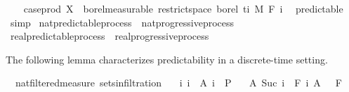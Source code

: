 \begin{isabellebody}
\ \ \isamarkupfalse%
\ {\isachardoublequoteopen}case{\isacharunderscore}{\kern0pt}prod\ X\ {\isasymin}\ borel{\isacharunderscore}{\kern0pt}measurable\ {\isacharparenleft}{\kern0pt}restrict{\isacharunderscore}{\kern0pt}space\ borel\ {\isacharbraceleft}{\kern0pt}ti{\isacharbraceright}{\kern0pt}\ {\isasymOtimes}\isactrlsub M\ F\ i{\isacharparenright}{\kern0pt}{\isachardoublequoteclose}\ \isamarkupfalse%
\ predictable\ \isamarkupfalse%
\ simp\isanewline
{}\isamarkupfalse%
%
\endisatagproof
{\isafoldproof}%
%
\isadelimproof
\isanewline
%
\endisadelimproof
\isanewline
{}\isamarkupfalse%
\ nat{\isacharunderscore}{\kern0pt}predictable{\isacharunderscore}{\kern0pt}process\ {\isasymsubseteq}\ nat{\isacharunderscore}{\kern0pt}progressive{\isacharunderscore}{\kern0pt}process%
\isadelimproof
\ %
\endisadelimproof
%
\isatagproof
\isacommand{{\isachardot}{\kern0pt}{\isachardot}{\kern0pt}}\isamarkupfalse%
%
\endisatagproof
{\isafoldproof}%
%
\isadelimproof
%
\endisadelimproof
\isanewline
{}\isamarkupfalse%
\ real{\isacharunderscore}{\kern0pt}predictable{\isacharunderscore}{\kern0pt}process\ {\isasymsubseteq}\ real{\isacharunderscore}{\kern0pt}progressive{\isacharunderscore}{\kern0pt}process%
\isadelimproof
\ %
\endisadelimproof
%
\isatagproof
\isacommand{{\isachardot}{\kern0pt}{\isachardot}{\kern0pt}}\isamarkupfalse%
%
\endisatagproof
{\isafoldproof}%
%
\isadelimproof
%
\endisadelimproof
%
\begin{isamarkuptext}%
The following lemma characterizes predictability in a discrete-time setting.%
\end{isamarkuptext}\isamarkuptrue%
\isamarkupfalse%
\ {\isacharparenleft}{\kern0pt}\ nat{\isacharunderscore}{\kern0pt}filtered{\isacharunderscore}{\kern0pt}measure{\isacharparenright}{\kern0pt}\ sets{\isacharunderscore}{\kern0pt}in{\isacharunderscore}{\kern0pt}filtration{\isacharcolon}{\kern0pt}\isanewline
\ \ \ {\isachardoublequoteopen}{\isacharparenleft}{\kern0pt}{\isasymUnion}i{\isachardot}{\kern0pt}\ {\isacharbraceleft}{\kern0pt}i{\isacharbraceright}{\kern0pt}\ {\isasymtimes}\ A\ i{\isacharparenright}{\kern0pt}\ {\isasymin}\ {\isasymSigma}\isactrlsub P{\isachardoublequoteclose}\isanewline
\ \ \ {\isachardoublequoteopen}A\ {\isacharparenleft}{\kern0pt}Suc\ i{\isacharparenright}{\kern0pt}\ {\isasymin}\ F\ i{\isachardoublequoteclose}\ {\isachardoublequoteopen}A\ {}\ {\isasymin}\ F\ {}{\isachardoublequoteclose}\isanewline

\end{isabellebody}
